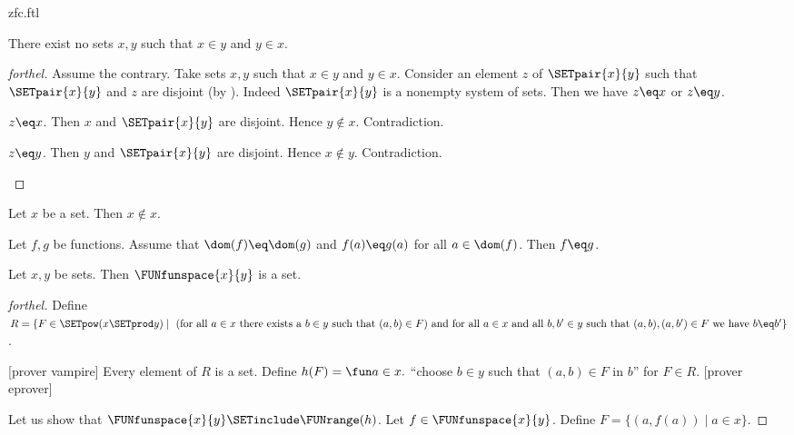 \documentclass{naproche-library}
\begin{document}
\begin{smodule}[title=ZFC]{zfc.ftl}
\begin{proposition}[forthel,id=FOUNDATIONS_10_8812282138066944]
  There exist no sets $x, y$ such that $x \in y$ and $y \in x$.
\end{proposition}
\begin{proof}[forthel]
  Assume the contrary.
  Take sets $x,y$ such that $x \in y$ and $y \in x$.
  Consider an element $z$ of $\SETpair{x}{y}$ such that $\SETpair{x}{y}$ and $z$ are disjoint (by ).
  Indeed $\SETpair{x}{y}$ is a nonempty system of sets.
  Then we have $z \eq x$ or $z \eq y$.

  \begin{case}{$z \eq x$.}
    Then $x$ and $\SETpair{x}{y}$ are disjoint.
    Hence $y \notin x$.
    Contradiction.
  \end{case}

  \begin{case}{$z \eq y$.}
    Then $y$ and $\SETpair{x}{y}$ are disjoint.
    Hence $x \notin y$.
    Contradiction.
  \end{case}
\end{proof}

\begin{corollary}[forthel,id=FOUNDATIONS_10_3086917813927936]
  Let $x$ be a set.
  Then $x \notin x$.
\end{corollary}

\begin{proposition}[forthel,id=FOUNDATIONS_10_4589652321021547]
  Let $f, g$ be functions.
  Assume that $\dom(f) \eq \dom(g)$ and $f(a) \eq g(a)$ for all $a \in \dom(f)$.
  Then $f \eq g$.
\end{proposition}

\begin{proposition}[forthel,id=FOUNDATIONS_10_4105036244189184]
  Let $x, y$ be sets.
  Then $\FUNfunspace{x}{y}$ is a set.
\end{proposition}
\begin{proof}[forthel]
  Define $R = \{ F \in \SETpow(x \SETprod y) \mid\text{ (for all }a \in x\text{ there exists a }b \in y\text{ such that }(a,b) \in F\text{) and for all }a \in x\text{ and all }b, b' \in y\text{ such that }(a,b), (a,b') \in F\text{ we have }b \eq b' \}$.

  [prover vampire]
  Every element of $R$ is a set. %
  Define $h(F) = \fun a \in x.$ ``choose $b \in y$ such that $(a,b) \in F$ in $b$'' for $F \in R$.
  [prover eprover]

  Let us show that $\FUNfunspace{x}{y} \SETinclude \FUNrange(h)$.
    Let $f \in \FUNfunspace{x}{y}$.
    Define $F = \{ (a,f(a)) \mid a \in x \}$.


\end{proof}
\end{smodule}
\end{document}
